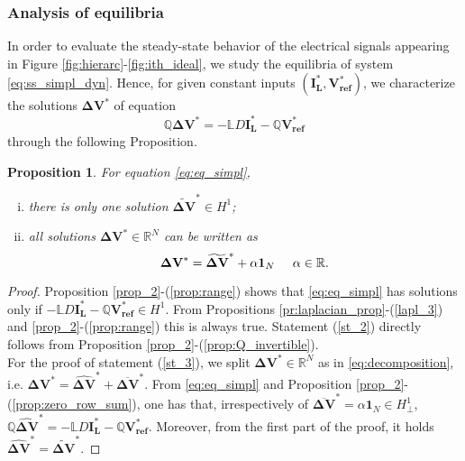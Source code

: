 \documentclass[a4paper]{article}
\theoremstyle{plain}
\newtheorem{prp}{Proposition}
\begin{document}
\subsubsection{Analysis of equilibria}
\label{sec:eq_an_1}
In order to evaluate the steady-state behavior of the electrical
signals appearing in Figure \ref{fig:hierarc}-\ref{fig:ith_ideal},
we study the equilibria of system \eqref{eq:ss_simpl_dyn}. Hence, for given constant inputs $(\mathbf{I_L^*},\mathbf{{V}_{ref}^*})$, we characterize the solutions $\mathbf{{\Delta V}^{*}}$ of equation
\begin{equation}
\label{eq:eq_simpl}
\mathbb{Q}\mathbf{{\Delta V}^{*}}= -\mathbb{L}D\mathbf{{I_{L}^*}}-\mathbb{Q}\mathbf{{V}_{ref}^*}
\end{equation}
through the following Proposition.
\begin{prp}
	\label{prop:equilibrium}
	For equation \eqref{eq:eq_simpl},
	\begin{enumerate}[(i)]
		\item \label{st_2} there is only one solution $\mathbf{\widetilde{ \Delta V}^{*}}\in H^1$;
		\item \label{st_3} all solutions $\mathbf{{\Delta V}^{*}}\in\mathbb{R}^{N}$ can be written as
		\begin{equation}
		\label{eq:infinite_equilibria}
		\mathbf{{\Delta V}^{*}} = \mathbf{\widetilde{\Delta V}^{*}} + \alpha\mathbf{1}_N\hspace{5mm}\alpha\in\mathbb{R}.
		\end{equation}
	\end{enumerate}
\end{prp}
\begin{proof}
	Proposition \ref{prop_2}-(\ref{prop:range}) shows that
	\eqref{eq:eq_simpl} has solutions only if $-\mathbb{L}D
	\mathbf{{I_{L}^*}}-\mathbb{Q}\mathbf{{V}_{ref}^*}\in H^1$. From
	Propositions \ref{pr:laplacian_prop}-(\ref{lapl_3}) and
	\ref{prop_2}-(\ref{prop:range}) this is always true. Statement (\ref{st_2}) directly follows from Proposition \ref{prop_2}-(\ref{prop:Q_invertible}).\\
	For the proof of statement (\ref{st_3}), we split $\mathbf{\Delta
		V}^{*}\in\mathbb{R}^N$ as in \eqref{eq:decomposition}, i.e. $\mathbf{\Delta
		V}^{*} = \mathbf{\widehat{\Delta V}^{*}} + \mathbf{\overline{\Delta
			V}^{*}}$. From \eqref{eq:eq_simpl} and Proposition
	\ref{prop_2}-(\ref{prop:zero_row_sum}), one has that, irrespectively
	of $\mathbf{\overline{\Delta V}^{*}}=\alpha \mathbf{1}_N\in H_{\perp}^1$, $\mathbb{Q} \mathbf{\widehat{\Delta V}^{*}}  = -\mathbb{L}D
	\mathbf{{I_{L}^*}}-\mathbb{Q}\mathbf{{V}_{ref}^*}$. Moreover, from the first part of the proof, it holds $\mathbf{\widehat{\Delta V}^{*}}=\mathbf{\widetilde{\Delta V}^{*}}$.
\end{proof}
\end{document}
